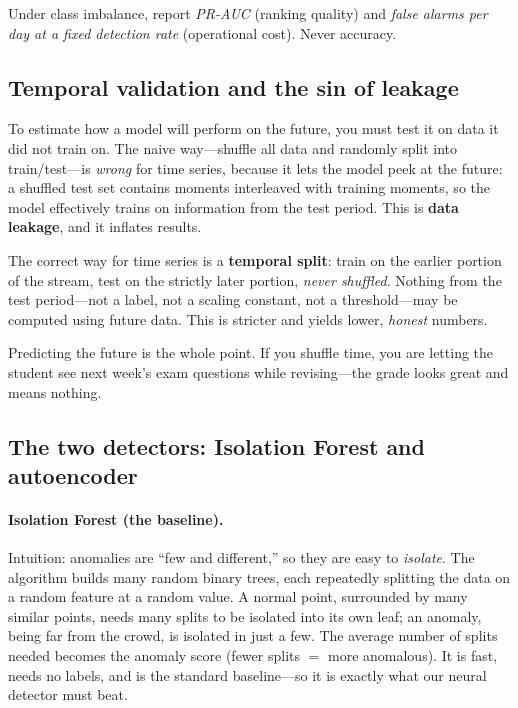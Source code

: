 \documentclass[11pt,a4paper]{article}
\newcommand{\keyword}[1]{\textbf{\color{accent}#1}}
\begin{document}
\begin{takeaway}
Under class imbalance, report \emph{PR-AUC} (ranking quality) and \emph{false
alarms per day at a fixed detection rate} (operational cost). Never accuracy.
\end{takeaway}

\subsection{Temporal validation and the sin of leakage}
\label{sec:primer-temporal}
To estimate how a model will perform on the future, you must test it on data it
did not train on. The naive way---shuffle all data and randomly split into
train/test---is \emph{wrong} for time series, because it lets the model peek at
the future: a shuffled test set contains moments interleaved with training
moments, so the model effectively trains on information from the test period.
This is \keyword{data leakage}, and it inflates results.

The correct way for time series is a \keyword{temporal split}: train on the
earlier portion of the stream, test on the strictly later portion, \emph{never
shuffled}. Nothing from the test period---not a label, not a scaling constant,
not a threshold---may be computed using future data. This is stricter and yields
lower, \emph{honest} numbers.

\begin{intuition}
Predicting the future is the whole point. If you shuffle time, you are letting
the student see next week's exam questions while revising---the grade looks great
and means nothing.
\end{intuition}

\subsection{The two detectors: Isolation Forest and autoencoder}
\paragraph{Isolation Forest (the baseline).} Intuition: anomalies are ``few and
different,'' so they are easy to \emph{isolate}. The algorithm builds many random
binary trees, each repeatedly splitting the data on a random feature at a random
value. A normal point, surrounded by many similar points, needs many splits to be
isolated into its own leaf; an anomaly, being far from the crowd, is isolated in
just a few. The average number of splits needed becomes the anomaly score
(fewer splits $=$ more anomalous). It is fast, needs no labels, and is the
standard baseline---so it is exactly what our neural detector must beat.
\end{document}

